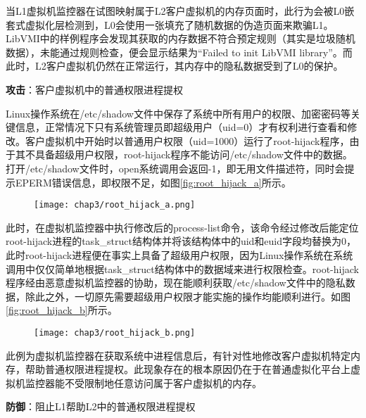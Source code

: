 当L1虚拟机监控器在试图映射属于L2客户虚拟机的内存页面时，此行为会被L0嵌套式虚拟化层检测到，L0会使用一张填充了随机数据的伪造页面来欺骗L1。LibVMI中的样例程序会发现其获取的内存数据不符合预定规则（其实是垃圾随机数据），未能通过规则检查，便会显示结果为``Failed to init LibVMI library''。而此时，L2客户虚拟机仍然在正常运行，其内存中的隐私数据受到了L0的保护。

\noindent
\textbf{攻击\uppercase\expandafter{}}：客户虚拟机中的普通权限进程提权

Linux操作系统在/etc/shadow文件中保存了系统中所有用户的权限、加密密码等关键信息，正常情况下只有系统管理员即超级用户（uid=0）才有权利进行查看和修改。客户虚拟机中开始时以普通用户权限（uid=1000）运行了root-hijack程序，由于其不具备超级用户权限，root-hijack程序不能访问/etc/shadow文件中的数据。打开/etc/shadow文件时，open系统调用会返回-1，即无用文件描述符，同时会提示EPERM错误信息，即权限不足，如图\ref{fig:root_hijack_a}所示。

\begin{figure}[!htbp]
  \centering
  \texttt{[image: chap3/root\_hijack\_a.png]}
\end{figure}

此时，在虚拟机监控器中执行修改后的process-list命令，该命令经过修改后能定位root-hijack进程的task\_struct结构体并将该结构体中的uid和euid字段均替换为0，此时root-hijack进程便在事实上具备了超级用户权限，因为Linux操作系统在系统调用中仅仅简单地根据task\_struct结构体中的数据域来进行权限检查。root-hijack程序经由恶意虚拟机监控器的协助，现在能顺利获取/etc/shadow文件中的隐私数据，除此之外，一切原先需要超级用户权限才能实施的操作均能顺利进行。如图\ref{fig:root_hijack_b}所示。

\begin{figure}[!htbp]
  \centering
  \texttt{[image: chap3/root\_hijack\_b.png]}
\end{figure}

此例为虚拟机监控器在获取系统中进程信息后，有针对性地修改客户虚拟机特定内存，帮助普通权限进程提权。此现象存在的根本原因仍在于在普通虚拟化平台上虚拟机监控器能不受限制地任意访问属于客户虚拟机的内存。

\noindent
\textbf{防御\uppercase\expandafter{}}：阻止L1帮助L2中的普通权限进程提权

